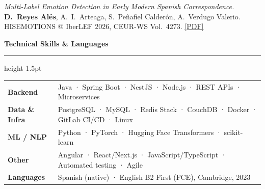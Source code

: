 \documentclass[9.5pt, a4paper]{article}
\newcommand{\cvsection}[1]{%
    \vspace{0.2cm}
    {\large \textbf{\textcolor{primary}{#1}}}
    \vspace{0.05cm}
    \textcolor{accent}{\hrule height 1.5pt}
    \vspace{0.1cm}
}
\begin{document}
\noindent \textit{Multi-Label Emotion Detection in Early Modern Spanish Correspondence.} \textbf{D.~Reyes Alés}, A.~I.~Arteaga, S.~Peñafiel Calderón, A.~Verdugo Valerio. HISEMOTIONS @ IberLEF 2026, CEUR-WS Vol.~4273. \href{https://ceur-ws.org/Vol-4273/HISEMOTIONS_paper7.pdf}{[PDF]}

\cvsection{Technical Skills \& Languages}

\begin{tabularx}{\textwidth}{lX}
    \textbf{\textcolor{primary}{Backend}} &
    Java · Spring Boot · NestJS · Node.js · REST APIs · Microservices \\[3pt]

    \textbf{\textcolor{primary}{Data \& Infra}} &
    PostgreSQL · MySQL · Redis Stack · CouchDB · Docker · GitLab CI/CD · Linux \\[3pt]

    \textbf{\textcolor{primary}{ML / NLP}} &
    Python · PyTorch · Hugging Face Transformers · scikit-learn \\[3pt]

    \textbf{\textcolor{primary}{Other}} &
    Angular · React/Next.js · JavaScript/TypeScript · Automated testing · Agile \\[3pt]

    \textbf{\textcolor{primary}{Languages}} &
    Spanish (native) · English B2 First (FCE), Cambridge, 2023 \\
\end{tabularx}
\end{document}

